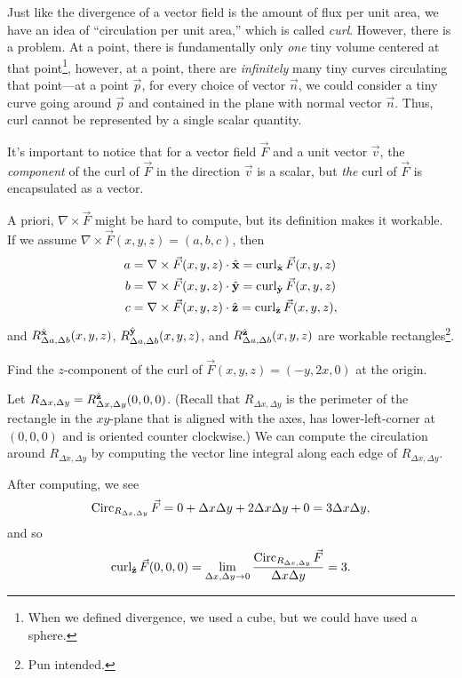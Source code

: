 Just like the divergence of a vector field is the amount of flux per unit area,
we have an idea of ``circulation per unit area,'' which is called \emph{curl}.
However, there is a problem.
At a point, there is fundamentally only \emph{one} tiny volume centered at that
point\footnote{ When we defined divergence, we used a cube, but we could have used
a sphere.}, however, at a point, there are \emph{infinitely} many tiny curves 
circulating that point---at a point $\vec p$,
for every choice of vector $\vec n$, we could consider a tiny curve going around 
$\vec p$ and contained in the plane with normal vector $\vec n$.  
Thus, curl cannot be represented by a single scalar quantity.

\DefCurl

It's important to notice that for a vector field $\vec F$
and a unit vector $\vec v$, the \emph{component} of the curl of $\vec F$ in the direction
$\vec v$ is a scalar, but \emph{the} curl  of $\vec F$ is encapsulated as a vector.

A priori, $\nabla \times \vec F$ might be hard to compute, but its definition 
makes it workable.  If we assume $\nabla \times \vec F(x,y,z)=(a,b,c)$, then
\begin{align*}
	a &= \nabla \times \vec F(x,y,z)\cdot {\hat {\mathbf x}} = \operatorname{curl}_{{\hat {\mathbf x}}} \vec F(x,y,z)\\
	b &= \nabla \times \vec F(x,y,z)\cdot {\hat {\mathbf y}} = \operatorname{curl}_{{\hat {\mathbf y}}} \vec F(x,y,z)\\
	c &= \nabla \times \vec F(x,y,z)\cdot {\hat {\mathbf z}} = \operatorname{curl}_{{\hat {\mathbf z}}} \vec F(x,y,z),
\end{align*}
and $R^{{\hat {\mathbf x}}}_{\Delta a,\Delta b}(x,y,z)$, $R^{{\hat {\mathbf y}}}_{\Delta a,\Delta b}(x,y,z)$,
and
$R^{{\hat {\mathbf z}}}_{\Delta a,\Delta b}(x,y,z)$ are workable rectangles\footnote{ Pun intended.}.

\begin{example}
	Find the $z$-component of the curl of $\vec F(x,y,z) = (-y, 2x, 0)$ at the origin.
	
	Let $R_{\Delta x,\Delta y}=R^{{\hat {\mathbf z}}}_{\Delta x,\Delta y}(0,0,0)$. (Recall that $R_{\Delta x,\Delta y}$
	is the perimeter of the rectangle in the $xy$-plane that is aligned with the axes, has lower-left-corner
	at $(0,0,0)$ and is oriented counter clockwise.)  We can compute the circulation around $R_{\Delta x,\Delta y}$
	by computing the vector line integral along each edge of $R_{\Delta x,\Delta y}$.

	After computing, we see
	\[
		\operatorname{Circ}_{R_{\Delta x,\Delta y}}\vec F = 0 + \Delta x\Delta y+ 2\Delta x\Delta y+0 = 3\Delta x\Delta y,
	\]
	and so
	\[
		\operatorname{curl}_{{\hat {\mathbf z}}}\vec F(0,0,0) = \lim_{\Delta x,\Delta y\to 0} \frac{\operatorname{Circ}_{R_{\Delta x,\Delta y}}\vec F}
		{\Delta x\Delta y} = 3.
	\]
\end{example}

